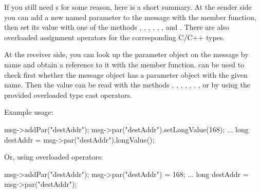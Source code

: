 If you still need s for some reason, here is a short summary.
At the sender side you can add a new named parameter to the message
with the  member function, then set its value with
one of the methods , ,
, , ,
, and . There are also overloaded
assignment operators for the corresponding C/C++ types.

At the receiver side, you can look up the parameter object on the message
by name and obtain a reference to it with the  member function.
 can be used to check first whether the message object has a parameter
object with the given name. Then the value can be read with the methods
, , ,
, , ,
, or by using the provided overloaded type cast operators.

Example usage:

\begin{cpp}
msg->addPar("destAddr");
msg->par("destAddr").setLongValue(168);
...
long destAddr = msg->par("destAddr").longValue();
\end{cpp}

Or, using overloaded operators:

\begin{cpp}
msg->addPar("destAddr");
msg->par("destAddr") = 168;
...
long destAddr = msg->par("destAddr");
\end{cpp}

